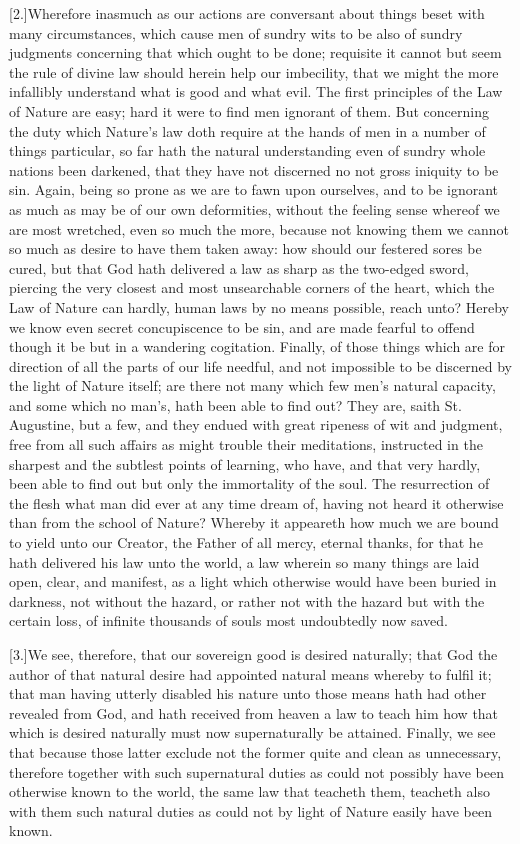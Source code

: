 [2.]Wherefore inasmuch as our actions are conversant about things beset with many circumstances, which cause men of sundry wits to be also of sundry judgments concerning that which ought to be done; requisite it cannot but seem the rule of divine law should herein help our imbecility, that we might the more infallibly understand what is good and what evil. The first principles of the Law of Nature are easy; hard it were to find men ignorant of them. But concerning the duty which Nature’s law doth require at the hands of men in a number of things particular, so far hath the natural understanding even of sundry whole nations been darkened, that they have not discerned no not gross iniquity to be sin. Again, being so prone as we are to fawn upon ourselves, and to be ignorant as much as may be of our own deformities, without the feeling sense whereof we are most wretched, even so much the more, because not knowing them we cannot so much as desire to have them taken away: how should our festered sores be cured, but that God hath delivered a law as sharp as the two-edged sword, piercing the very closest and most unsearchable corners of the heart, which the Law of Nature can hardly, human laws by no means possible, reach unto? Hereby we know even secret concupiscence to be sin, and are made fearful to offend though it be but in a wandering cogitation. Finally, of those things which are for direction of all the parts of our life needful, and not impossible to be discerned by the  light of Nature itself; are there not many which few men’s natural capacity, and some which no man’s, hath been able to find out? They are, saith St. Augustine, but a few, and they endued with great ripeness of wit and judgment, free from all such affairs as might trouble their meditations, instructed in the sharpest and the subtlest points of learning, who have, and that very hardly, been able to find out but only the immortality of the soul. The resurrection of the flesh what man did ever at any time dream of, having not heard it otherwise than from the school of Nature? Whereby it appeareth how much we are bound to yield unto our Creator, the Father of all mercy, eternal thanks, for that he hath delivered his law unto the world, a law wherein so many things are laid open, clear, and manifest, as a light which otherwise would have been buried in darkness, not without the hazard, or rather not with the hazard but with the certain loss, of infinite thousands of souls most undoubtedly now saved.

[3.]We see, therefore, that our sovereign good is desired naturally; that God the author of that natural desire had appointed natural means whereby to fulfil it; that man having utterly disabled his nature unto those means hath had other revealed from God, and hath received from heaven a law to teach him how that which is desired naturally must now supernaturally be attained. Finally, we see that because those latter exclude not the former quite and clean as unnecessary, therefore together with such supernatural duties as could not possibly have been otherwise known to the world, the same law that teacheth them, teacheth also with them such natural duties as could not by light of Nature easily have been known.

